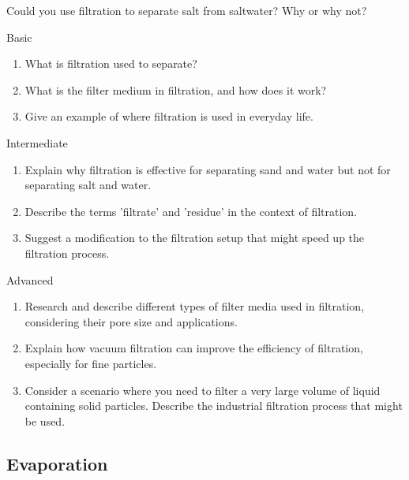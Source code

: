 \begin{stopandthink}
Could you use filtration to separate salt from saltwater? Why or why not?
\end{stopandthink}

\begin{tieredquestions}{Basic}
\begin{enumerate}
    \item What is filtration used to separate?
    \item What is the filter medium in filtration, and how does it work?
    \item Give an example of where filtration is used in everyday life.
\end{enumerate}
\end{tieredquestions}

\begin{tieredquestions}{Intermediate}
\begin{enumerate}
    \item Explain why filtration is effective for separating sand and water but not for separating salt and water.
    \item Describe the terms 'filtrate' and 'residue' in the context of filtration.
    \item  Suggest a modification to the filtration setup that might speed up the filtration process.
\end{enumerate}
\end{tieredquestions}

\begin{tieredquestions}{Advanced}
\begin{enumerate}
    \item  Research and describe different types of filter media used in filtration, considering their pore size and applications.
    \item  Explain how vacuum filtration can improve the efficiency of filtration, especially for fine particles.
    \item  Consider a scenario where you need to filter a very large volume of liquid containing solid particles. Describe the industrial filtration process that might be used.
\end{enumerate}
\end{tieredquestions}


\subsection{Evaporation}

